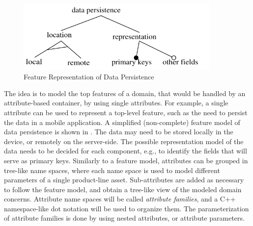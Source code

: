 \begin{figure}[ht]
	\begin{center}
		\includegraphics[width=10cm,height=!]{ch03/foda}
	\end{center}
	\caption{Feature Representation of Data Persistence}
	\label{c3fig:foda}
\end{figure}

The idea is to model the top features of a domain, that would be handled by an attribute-based container, by using single attributes. For example, a single attribute can be used to represent a top-level feature, such as the need to persist the data in a mobile application. A simplified (non-complete) feature model of data persistence is shown in . The data may need to be stored locally in the device, or remotely on the server-side. The possible representation model of the data needs to be decided for each component, e.g., to identify the fields that will serve as primary keys. Similarly to a feature model, attributes can be grouped in tree-like name spaces, where each name space is used to model different parameters of a single product-line asset. Sub-attributes are added as necessary to follow the feature model, and obtain a tree-like view of the modeled domain concerns. Attribute name spaces will be called \textit{attribute families}, and a C++ \cite{cpp.97} namespace-like dot notation will be used to organize them. The parameterization of attribute families is done by using nested attributes, or attribute parameters.

